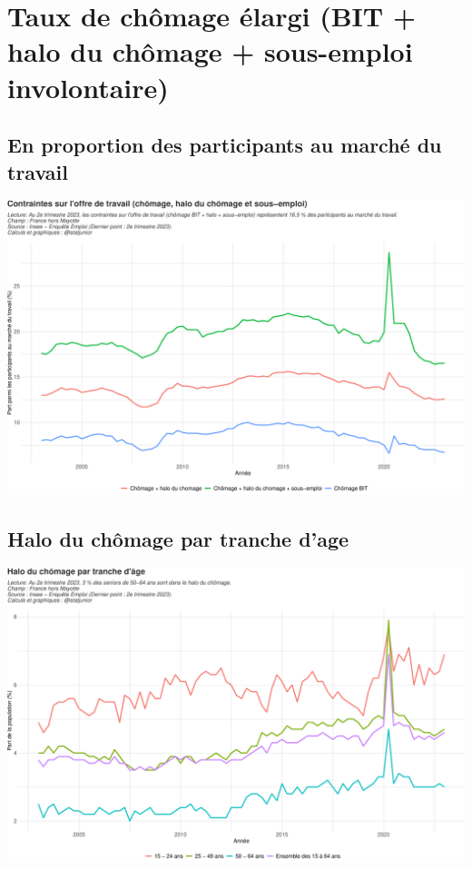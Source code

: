 \documentclass[
  paper=a4,
  ,captions=tableheading
]{scrartcl}
\begin{document}
\newpage

\hypertarget{taux-de-chuxf4mage-uxe9largi-bit-halo-du-chuxf4mage-sous-emploi-involontaire}{%
\section{Taux de chômage élargi (BIT + halo du chômage + sous-emploi
involontaire)}\label{taux-de-chuxf4mage-uxe9largi-bit-halo-du-chuxf4mage-sous-emploi-involontaire}}

\hypertarget{en-proportion-des-participants-au-marchuxe9-du-travail}{%
\subsection{En proportion des participants au marché du
travail}\label{en-proportion-des-participants-au-marchuxe9-du-travail}}

\includegraphics{rapport_activite_emploi_chomage_insee_files/figure-latex/unnamed-chunk-20-1.pdf}

\hypertarget{halo-du-chuxf4mage-par-tranche-dage}{%
\subsection{Halo du chômage par tranche
d'age}\label{halo-du-chuxf4mage-par-tranche-dage}}

\includegraphics{rapport_activite_emploi_chomage_insee_files/figure-latex/unnamed-chunk-21-1.pdf}
\end{document}
